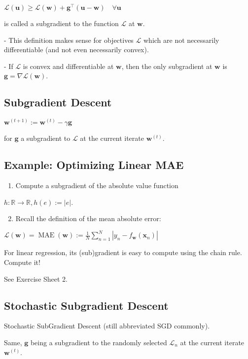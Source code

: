 $
\mathcal{L}(\mathbf{u}) \geq \mathcal{L}(\mathbf{w})+\mathbf{g}^{\top}(\mathbf{u}-\mathbf{w}) \quad \forall \mathbf{u}
$

is called a subgradient to the function $\mathcal{L}$ at $\mathbf{w}$.

- This definition makes sense for objectives $\mathcal{L}$ which are not necessarily differentiable (and not even necessarily convex).

- If $\mathcal{L}$ is convex and differentiable at $\mathbf{w}$, then the only subgradient at $\mathbf{w}$ is $\mathbf{g}=\nabla \mathcal{L}(\mathbf{w})$.

\subsection*{Subgradient Descent}
$
\mathbf{w}^{(t+1)}:=\mathbf{w}^{(t)}-\gamma \mathbf{g}
$

for $\mathbf{g}$ a subgradient to $\mathcal{L}$ at the current iterate $\mathbf{w}^{(t)}$.

\subsection*{Example: Optimizing Linear MAE}
\begin{enumerate}
  \item Compute a subgradient of the absolute value function
\end{enumerate}

$h: \mathbb{R} \rightarrow \mathbb{R}, h(e):=|e|$.

\begin{enumerate}
  \setcounter{enumi}{1}
  \item Recall the definition of the mean absolute error:
\end{enumerate}

$\mathcal{L}(\mathbf{w})=\operatorname{MAE}(\mathbf{w}):=\frac{1}{N} \sum_{n=1}^{N}\left|y_{n}-f_{\mathbf{w}}\left(\mathbf{x}_{n}\right)\right|$

For linear regression, its (sub)gradient is easy to compute using the chain rule. Compute it!

See Exercise Sheet 2.

\subsection*{Stochastic Subgradient Descent}
Stochastic SubGradient Descent (still abbreviated SGD commonly).

Same, $\mathbf{g}$ being a subgradient to the randomly selected $\mathcal{L}_{n}$ at the current iterate $\mathbf{w}^{(t)}$.

